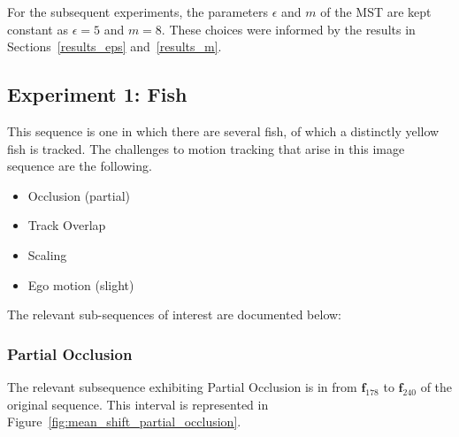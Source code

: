 For the subsequent experiments, the parameters $\epsilon$ and $m$ of the MST are
kept constant as $\epsilon=5$ and $m=8$. These choices were informed by the results in
Sections~\ref{results_eps} and~\ref{results_m}. 

\subsection{Experiment 1: Fish}
This sequence is one in which there are several fish, of which a distinctly yellow fish is
tracked. The challenges to motion tracking that arise in this image sequence are the following.
\begin{itemize}
    \item Occlusion (partial)
    \item Track Overlap
    \item Scaling 
    \item Ego motion (slight) 
\end{itemize}

The relevant sub-sequences of interest are documented below:

\subsubsection{Partial Occlusion}\label{mean_shift_partial_occlusion}
The relevant subsequence exhibiting Partial Occlusion is in from
$\mathbf{f}_{178}$ to $\mathbf{f}_{240}$ of the original sequence. This interval
is represented in Figure~\ref{fig:mean_shift_partial_occlusion}.

